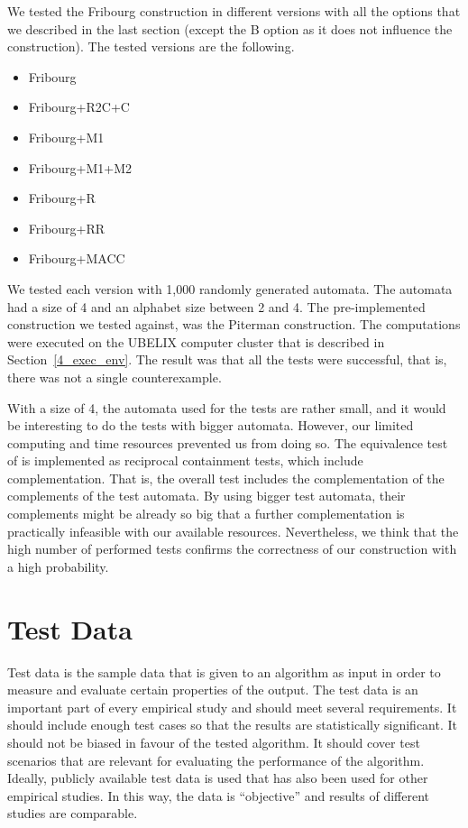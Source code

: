 We tested the Fribourg construction in different versions with all the options that we described in the last section (except the B option as it does not influence the construction). The tested versions are the following.
\begin{itemize}
\item Fribourg
\item Fribourg+R2C+C
\item Fribourg+M1
\item Fribourg+M1+M2
\item Fribourg+R
\item Fribourg+RR
\item Fribourg+MACC
\end{itemize}

We tested each version with 1,000 randomly generated automata. The automata had a size of 4 and an alphabet size between 2 and 4. The pre-implemented construction we tested against, was the Piterman construction. The computations were executed on the UBELIX computer cluster that is described in Section~\ref{4_exec_env}. The result was that all the tests were successful, that is, there was not a single counterexample.

With a size of 4, the automata used for the tests are rather small, and it would be interesting to do the tests with bigger automata. However, our limited computing and time resources prevented us from doing so. The equivalence test of \goal{} is implemented as reciprocal containment tests, which include complementation. That is, the overall test includes the complementation of the complements of the test automata. By using bigger test automata, their complements might be already so big that a further complementation is practically infeasible with our available resources. Nevertheless, we think that the high number of performed tests confirms the correctness of our construction with a high probability.


\section{Test Data}
Test data is the sample data that is given to an algorithm as input in order to measure and evaluate certain properties of the output. The test data is an important part of every empirical study and should meet several requirements. It should include enough test cases so that the results are statistically significant. It should not be biased in favour of the tested algorithm. It should cover test scenarios that are relevant for evaluating the performance of the algorithm. Ideally, publicly available test data is used that has also  been used for other empirical studies. In this way, the data is ``objective'' and results of different studies are comparable.


